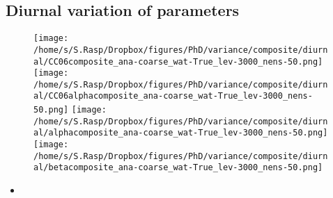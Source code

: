 \documentclass[a4paper, 12pt]{article}
\begin{document}
\newpage

\subsection{Diurnal variation of parameters}
\begin{figure}[h!]
\noindent \centering
\texttt{[image: /home/s/S.Rasp/Dropbox/figures/PhD/variance/composite/diurnal/CC06composite\_ana-coarse\_wat-True\_lev-3000\_nens-50.png]}
\texttt{[image: /home/s/S.Rasp/Dropbox/figures/PhD/variance/composite/diurnal/CC06alphacomposite\_ana-coarse\_wat-True\_lev-3000\_nens-50.png]}
\texttt{[image: /home/s/S.Rasp/Dropbox/figures/PhD/variance/composite/diurnal/alphacomposite\_ana-coarse\_wat-True\_lev-3000\_nens-50.png]}
\texttt{[image: /home/s/S.Rasp/Dropbox/figures/PhD/variance/composite/diurnal/betacomposite\_ana-coarse\_wat-True\_lev-3000\_nens-50.png]}\\
\caption{} \label{fig:geographical}
\end{figure}
\begin{itemize}
 \item 
\end{itemize}

\newpage
\end{document}
